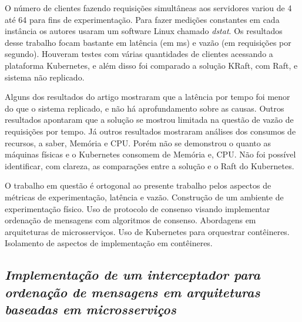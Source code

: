 O número de clientes fazendo requisições simultâneas aos servidores variou de 4 até 64 para fins de experimentação. Para fazer medições constantes em cada instância os autores usaram um software Linux chamado \textit{dstat}. Os resultados desse trabalho focam bastante em latência (em ms) e vazão (em requisições por segundo). Houveram testes com várias quantidades de clientes acessando a plataforma Kubernetes, e além disso foi comparado a solução KRaft, com Raft, e sistema não replicado.


Alguns dos resultados do artigo mostraram que a latência por tempo foi menor do que o sistema replicado, e não há aprofundamento sobre as causas. Outros resultados apontaram que a solução se mostrou limitada na questão de vazão de requisições por tempo. Já outros resultados mostraram análises dos consumos de recursos, a saber, Memória e CPU. Porém não se demonstrou o quanto as máquinas físicas e o Kubernetes consomem de Memória e, CPU. Não foi possível identificar, com clareza, as comparações entre a solução e o Raft do Kubernetes.


O trabalho em questão é ortogonal ao presente trabalho pelos aspectos de métricas de experimentação, latência e vazão. Construção de um ambiente de experimentação físico. Uso de protocolo de consenso visando implementar ordenação de mensagens com algoritmos de consenso. Abordagens em arquiteturas de microsserviços. Uso de Kubernetes para orquestrar contêineres. Isolamento de aspectos de implementação em contêineres.



\pagebreak

\subsection{\textit{Implementação de um interceptador para ordenação de mensagens em arquiteturas baseadas em microsserviços}}

